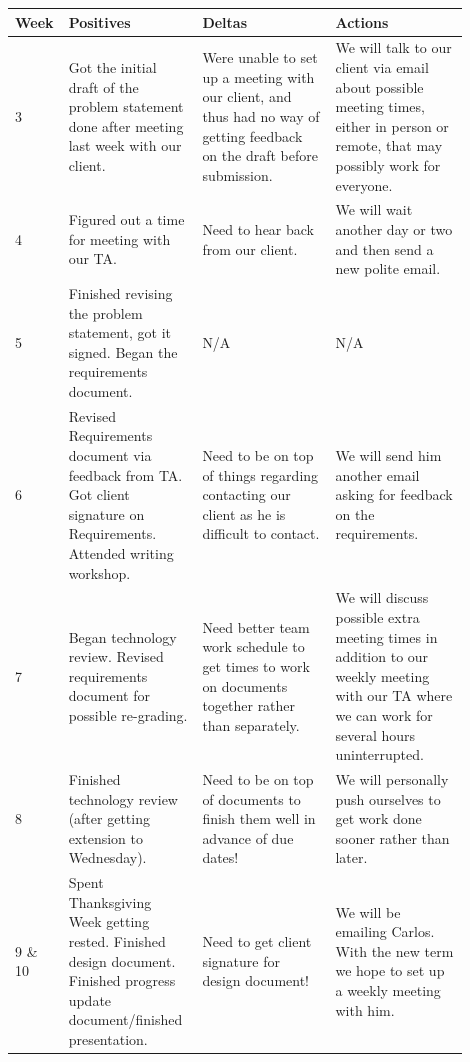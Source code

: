 \documentclass[onecolumn, draftclsnofoot,10pt, compsoc]{IEEEtran}
\begin{document}
\begin{tabular}{|p{0.05\linewidth}|p{0.285\linewidth}|p{0.285\linewidth}|p{0.285\linewidth}|}
\hline 
Week & Positives & Deltas & Actions \\ \hline

	3 
	& Got the initial draft of the problem statement done after meeting last 
	week with our client. 
	& Were unable to set up a meeting with our client, and thus had no way of 
	getting feedback on the draft before submission. 
	& We will talk to our client via email about possible meeting times, either 
	in person or remote, that may possibly work for everyone. \\ \hline

	4 
	& Figured out a time for meeting with our TA. 
	& Need to hear back from our client. 
	& We will wait another day or two and then send a new polite email. \\ \hline

	5 
	& Finished revising the problem statement, got it signed. 
		Began the requirements document. 
	& N/A 
	& N/A\\ \hline

	6 
	& Revised Requirements document via feedback from TA. Got client signature on Requirements. 
		Attended writing workshop. 
	& Need to be on top of things regarding contacting our client as 
		he is difficult to contact. 
	& We will send him another email asking for feedback on the requirements. \\ \hline

	7 
	& Began technology review. Revised requirements document for possible re-grading. 
	& Need better team work schedule to get times to work on documents 
	together rather than separately. 
	& We will discuss possible extra meeting times in addition to our weekly meeting 
	with our TA where we can work for several hours uninterrupted. \\ \hline

	8 
	& Finished technology review (after getting extension to Wednesday). 
	& Need to be on top of documents to finish them well in advance of due dates! 
	& We will personally push ourselves to get work done sooner rather than later. \\ \hline


	9 \hspace{3mm} \& 10 
	& Spent Thanksgiving Week getting rested. Finished design document. 
		Finished progress update document/finished presentation. 
	& Need to get client signature for design document! 
	& We will be emailing Carlos. With the new term we hope 
		to set up a weekly meeting with him.  \\ \hline

\end{tabular}
\end{document}
